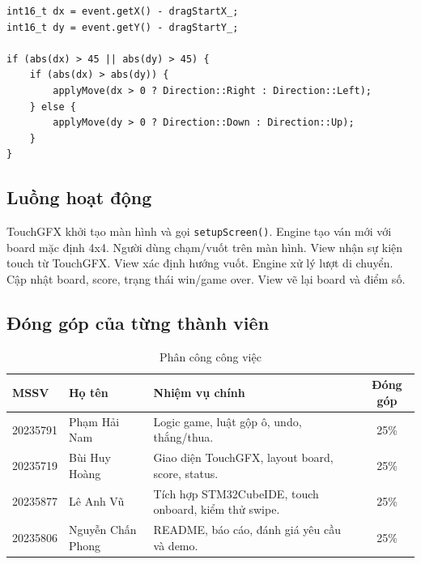 \documentclass[12pt,a4paper]{article}
\begin{document}
\begin{lstlisting}[style=cppstyle]
int16_t dx = event.getX() - dragStartX_;
int16_t dy = event.getY() - dragStartY_;

if (abs(dx) > 45 || abs(dy) > 45) {
    if (abs(dx) > abs(dy)) {
        applyMove(dx > 0 ? Direction::Right : Direction::Left);
    } else {
        applyMove(dy > 0 ? Direction::Down : Direction::Up);
    }
}
\end{lstlisting}

\subsection{Luồng hoạt động}

\begin{algorithm}[H]
\caption{Luồng xử lý game 2048 với TouchGFX}
\begin{algorithmic}[1]
\State TouchGFX khởi tạo màn hình và gọi \texttt{setupScreen()}.
\State Engine tạo ván mới với board mặc định 4x4.
    \State Người dùng chạm/vuốt trên màn hình.
    \State View nhận sự kiện touch từ TouchGFX.
    \State View xác định hướng vuốt.
    \State Engine xử lý lượt di chuyển.
        \State Cập nhật board, score, trạng thái win/game over.
        \State View vẽ lại board và điểm số.
    \EndIf
\EndWhile
\end{algorithmic}
\end{algorithm}

\subsection{Đóng góp của từng thành viên}

\begin{table}[H]
    \centering
    \begin{tabular}{llp{7cm}c}
        \toprule
        \textbf{MSSV} & \textbf{Họ tên} & \textbf{Nhiệm vụ chính} & \textbf{Đóng góp} \\
        \midrule
        20235791 & Phạm Hải Nam & Logic game, luật gộp ô, undo, thắng/thua. & 25\% \\
        20235719 & Bùi Huy Hoàng & Giao diện TouchGFX, layout board, score, status. & 25\% \\
        20235877 & Lê Anh Vũ & Tích hợp STM32CubeIDE, touch onboard, kiểm thử swipe. & 25\% \\
        20235806 & Nguyễn Chấn Phong & README, báo cáo, đánh giá yêu cầu và demo. & 25\% \\
        \bottomrule
    \end{tabular}
    \caption{Phân công công việc}
\end{table}
\end{document}
